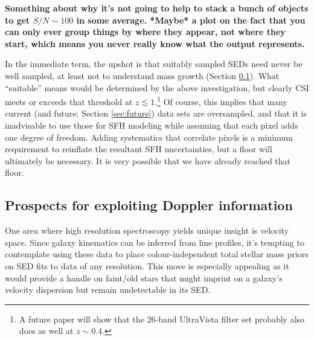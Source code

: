 \documentclass[a4paper,fleqn,usenatbib]{mnras}
\newcommand{\bfr}{\bf\color{red}}
\begin{document}
{\bfr Something about why it's not going to help to stack a bunch of objects to get $S/N\sim100$
in some average. *Maybe* a plot on the fact that you can only ever group things by where they 
appear, not where they start, which means you never really know what the output represents.}



In the immediate term, the upshot is that suitably sampled SEDs need never be well sampled, at least
not to understand mass growth (Section \ref{sec:redshifts}). What ``suitable'' means would be determined 
by the above investigation, but clearly CSI meets or exceeds that threshold at $z\lesssim1$.\footnote{A future 
paper will show that the 26-band UltraVista filter set \citep{Muzzin13} probably also does as well at 
$z\sim0.4$.} Of course, this implies that many current (and future; Section \ref{sec:future}) data sets 
are oversampled, and that it is inadvisable to use those for SFH modeling while assuming that each 
pixel adds one degree of freedom. Adding systematics that correlate pixels is a minimum requirement 
to reinflate the resultant SFH uncertainties, but a floor will ultimately be necessary. It is very possible 
that we have already reached that floor.
\fi


\subsection{Prospects for exploiting Doppler information}
\label{sec:redshifts}

One area where high resolution spectroscopy yields unique insight is velocity space. Since
galaxy kinematics can be inferred from line profiles, it's tempting to contemplate using these data
to place colour-independent total stellar mass priors on SED fits to data of any resolution. This
move is especially appealing as it would provide a handle on faint/old stars that might imprint on 
a galaxy's velocity dispersion but remain undetectable in its SED. 
\end{document}
